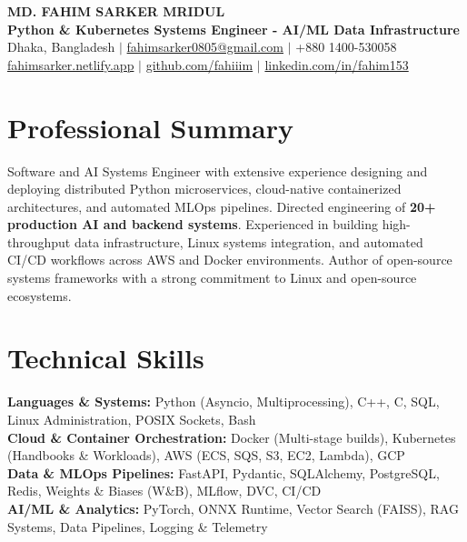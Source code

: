 \documentclass[9.5pt,a4paper]{article}
\begin{document}
{\centering
    {\Large \textbf{MD. FAHIM SARKER MRIDUL}}\\[1pt]
    \textbf{Python \& Kubernetes Systems Engineer - AI/ML Data Infrastructure}\\[1pt]
    Dhaka, Bangladesh \;$\vert$\; \href{mailto:fahimsarker0805@gmail.com}{fahimsarker0805@gmail.com} \;$\vert$\; +880 1400-530058\\[1pt]
    \href{https://fahimsarker.netlify.app}{fahimsarker.netlify.app} \;$\vert$\; \href{https://github.com/fahiiim}{github.com/fahiiim} \;$\vert$\; \href{https://linkedin.com/in/fahim153}{linkedin.com/in/fahim153}\par
}

\vspace{-4pt}
\section*{Professional Summary}
Software and AI Systems Engineer with extensive experience designing and deploying distributed Python microservices, cloud-native containerized architectures, and automated MLOps pipelines. Directed engineering of \textbf{20+ production AI and backend systems}. Experienced in building high-throughput data infrastructure, Linux systems integration, and automated CI/CD workflows across AWS and Docker environments. Author of open-source systems frameworks with a strong commitment to Linux and open-source ecosystems.

\section*{Technical Skills}
\noindent
\textbf{Languages \& Systems:} Python (Asyncio, Multiprocessing), C++, C, SQL, Linux Administration, POSIX Sockets, Bash\\
\textbf{Cloud \& Container Orchestration:} Docker (Multi-stage builds), Kubernetes (Handbooks \& Workloads), AWS (ECS, SQS, S3, EC2, Lambda), GCP\\
\textbf{Data \& MLOps Pipelines:} FastAPI, Pydantic, SQLAlchemy, PostgreSQL, Redis, Weights \& Biases (W\&B), MLflow, DVC, CI/CD\\
\textbf{AI/ML \& Analytics:} PyTorch, ONNX Runtime, Vector Search (FAISS), RAG Systems, Data Pipelines, Logging \& Telemetry
\end{document}

